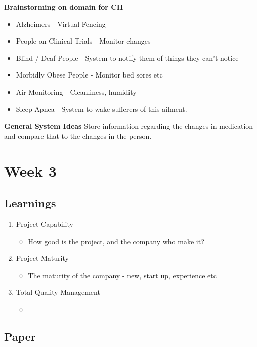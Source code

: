 \textbf{Brainstorming on domain for CH}
\begin{itemize}
\item Alzheimers - Virtual Fencing
\item People on Clinical Trials - Monitor changes
\item Blind / Deaf People - System to notify them of things they can't notice
\item Morbidly Obese People - Monitor bed sores etc
\item Air Monitoring - Cleanliness, humidity
\item Sleep Apnea - System to wake sufferers of this ailment.
\end{itemize}

\textbf{General System Ideas}\newline \newline
Store information regarding the changes in medication and compare that to the changes in the person.
\chapter{Week 3}

\section{Learnings}
\begin{enumerate}
\item Project Capability
\begin{itemize}
\item How good is the project, and the company who make it?
\end{itemize}
\item Project Maturity
\begin{itemize}
\item The maturity of the company - new, start up, experience etc
\end{itemize}
\item Total Quality Management
\begin{itemize}
\item
\end{itemize}
\end{enumerate}

\section{Paper}

